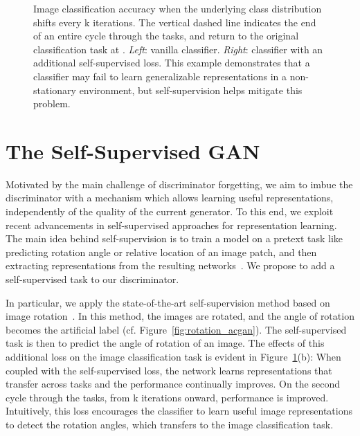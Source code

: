 \documentclass[10pt,twocolumn,letterpaper]{article}
\begin{document}
\begin{figure}[t]
\begin{center}
\end{center}
\caption{\label{fig:non-stationary}
Image classification accuracy when the underlying class distribution shifts every k iterations.
The vertical dashed line indicates the end of an entire cycle through the tasks, and return to the original classification task at .
\emph{Left}: vanilla classifier.
\emph{Right}: classifier with an additional self-supervised loss.
This example demonstrates that a classifier may fail to learn generalizable representations in a non-stationary environment, but self-supervision helps mitigate this problem.}
\end{figure}

\section{The Self-Supervised GAN}
Motivated by the main challenge of discriminator forgetting, we aim to imbue the discriminator with a mechanism which allows learning useful representations, independently of the quality of the current generator. To this end, we exploit recent advancements in self-supervised approaches for representation learning. The main idea behind self-supervision is to train a model on a pretext task like predicting rotation angle or relative location of an image patch, and then extracting representations from the resulting networks~\citep{dosovitskiy2014,doersch2015unsupervised,zhang2016colorful}. We propose to add a self-supervised task to our discriminator.

In particular, we apply the state-of-the-art self-supervision method based on image rotation~\citep{gidaris2018unsupervised}.
In this method, the images are rotated, and the angle of rotation becomes the artificial label (cf. Figure~\ref{fig:rotation_acgan}).
The self-supervised task is then to predict the angle of rotation of an image. The effects of this additional loss on the image classification task is evident in Figure~\ref{fig:non-stationary}(b): When coupled with the self-supervised loss, the network learns representations that transfer across tasks and the performance continually improves.
On the second cycle through the tasks, from k iterations onward, performance is improved.
Intuitively, this loss encourages the classifier to learn useful image representations to detect the rotation angles, which transfers to the image classification task.
\end{document}
